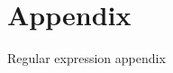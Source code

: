 \section{Appendix}
\label{section:appendix}

\label{section:appendix:regex}
Regular expression appendix